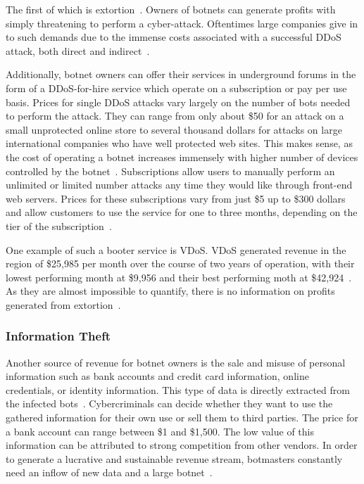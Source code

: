 The first of which is extortion~\cite{Bailey09}.
Owners of botnets can generate profits with simply threatening to perform a cyber-attack.
Oftentimes large companies give in to such demands due to the immense costs associated with a successful DDoS attack, both direct and indirect~\cite{Namestnikov09}.

Additionally, botnet owners can offer their services in underground forums in the form of a DDoS-for-hire service which operate on a subscription or pay per use basis.
Prices for single DDoS attacks vary largely on the number of bots needed to perform the attack.
They can range from only about \$50 for an attack on a small unprotected online store to several thousand dollars for attacks on large international companies who have well protected web sites.
This makes sense, as the cost of operating a botnet increases immensely with higher number of devices controlled by the botnet~\cite{Namestnikov09}.
Subscriptions allow users to manually perform an unlimited or limited number attacks any time they would like through front-end web servers.
Prices for these subscriptions vary from just \$5 up to \$300 dollars and allow customers to use the service for one to three months, depending on the tier of the subscription~\cite{Bailey09}.

One example of such a booter service is VDoS. VDoS generated revenue in the region of \$25,985 per month over the course of two years of operation, with their lowest performing month at \$9,956 and their best performing moth at \$42,924~\cite{Bailey09}.
As they are almost impossible to quantify, there is no information on profits generated from extortion~\cite{Namestnikov09}.

\subsubsection{Information Theft}
Another source of revenue for botnet owners is the sale and misuse of personal information such as bank accounts and credit card information, online credentials, or identity information.
This type of data is directly extracted from the infected bots~\cite{Bottazzi14}.
Cybercriminals can decide whether they want to use the gathered information for their own use or sell them to third parties.
The price for a bank account can range between \$1 and \$1,500.
The low value of this information can be attributed to strong competition from other vendors.
In order to generate a lucrative and sustainable revenue stream, botmasters constantly need an inflow of new data and a large botnet~\cite{Namestnikov09}.

